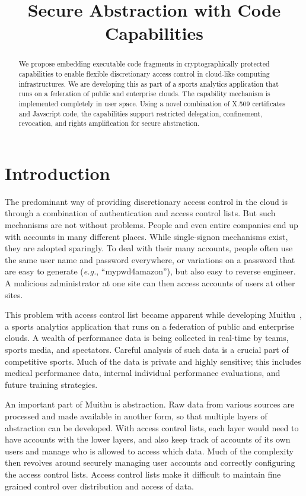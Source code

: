 \documentclass[10pt, conference, compsocconf]{IEEEtran}
\title{Secure Abstraction with Code Capabilities}
\author{\IEEEauthorblockN{Robbert van Renesse}
\IEEEauthorblockA{Cornell University\\
rvr@cs.cornell.edu}
\and
\IEEEauthorblockN{H{\aa}vard Johansen}
\IEEEauthorblockA{University of Troms{\o}\\
haavardj@cs.uit.no}
\and
\IEEEauthorblockN{Nihar Naigaonkar}
\IEEEauthorblockA{Cornell University\\
niharnaigaonkar@gmail.com}
\and
\IEEEauthorblockN{Dag Johansen}
\IEEEauthorblockA{University of Troms{\o}\\
dag@cs.uit.no}
}
\begin{document}
\maketitle

\begin{abstract}
We propose embedding executable code fragments in cryptographically protected capabilities to
enable flexible discretionary access control in cloud-like computing infrastructures.
We are developing this as part of a sports analytics application that runs on a federation of public and enterprise clouds.
The capability mechanism is implemented completely in user space.
Using a novel combination of X.509 certificates and Javscript code, the capabilities support restricted delegation,
confinement, revocation, and rights amplification for secure abstraction.
\end{abstract}

\section{Introduction}

The predominant way of providing discretionary access control in
the cloud is through a combination of authentication and access
control lists.  But such mechanisms are not without problems.  People
and even entire companies end up with accounts in many different places.
While single-signon mechanisms exist, they are adopted sparingly.
To deal with their many accounts, people often use the
same user name and password everywhere, or variations on a password
that are easy to generate (\emph{e.g.}, ``mypwd4amazon''), but also
easy to reverse engineer.  A malicious administrator at one site can then
access accounts of users at other sites.

This problem with access control list became apparent while developing 
Muithu~\cite{Joha1208:Muithu}, a sports analytics application that runs on a federation of public and enterprise clouds.  
A wealth of performance data is being collected in real-time by teams, sports media, and spectators.
Careful analysis of such data is a crucial part of competitive sports.
Much of the data is private and highly sensitive;
this includes medical performance data, internal individual performance evaluations, and future training strategies.

An important part of Muithu is abstraction.  Raw data from various
sources are processed and made available in another form, 
so that multiple layers of abstraction can be developed.
With access control lists, each layer would need to have
accounts with the lower layers, and also keep track of accounts
of its own users and manage who is allowed to access which data.
Much of the complexity then revolves around securely managing
user accounts and correctly configuring the access control lists.
Access control lists make it difficult to maintain fine grained
control over distribution and access of data.
\end{document}
